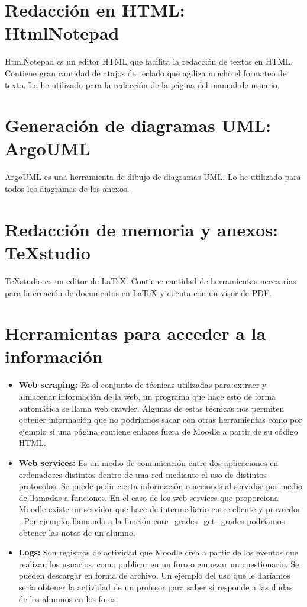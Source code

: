 \section{Redacción en HTML: HtmlNotepad}
HtmlNotepad es un editor HTML que facilita la redacción de textos en HTML. Contiene gran cantidad de atajos de teclado que agiliza mucho el formateo de texto. Lo he utilizado para la redacción de la página del manual de usuario.
\section{Generación de diagramas UML: ArgoUML}
ArgoUML es una herramienta de dibujo de diagramas UML. Lo he utilizado para todos los diagramas de los anexos. 
\section{Redacción de memoria y anexos: TeXstudio}
TeXstudio es un editor de LaTeX. Contiene cantidad de herramientas necesarias para la creación de documentos en LaTeX y cuenta con un visor de PDF.
 
 
 
 
 
 
\section{Herramientas para acceder a la información}
\begin{itemize}
	\item \textbf{Web scraping:}
	Es el conjunto de técnicas utilizadas para extraer y almacenar información de la web, un programa que hace esto de forma automática se llama web crawler. Algunas de estas técnicas nos permiten obtener información que no podríamos sacar con otras herramientas como por ejemplo si una página contiene enlaces fuera de Moodle a partir de su código HTML.
	\item \textbf{Web services:}
	Es un medio de comunicación entre dos aplicaciones en ordenadores distintos dentro de una red mediante el uso de distintos protocolos. Se puede pedir cierta información o acciones al servidor por medio de llamadas a funciones. En el caso de los web services que proporciona Moodle existe un servidor que hace de intermediario entre cliente y proveedor \cite{moodle-2020}. Por ejemplo, llamando a la función core\_grades\_get\_grades podríamos obtener las notas de un alumno.
	\item \textbf{Logs:}
	Son registros de actividad que Moodle crea a partir de los eventos que realizan los usuarios, como publicar en un foro o empezar un cuestionario. Se pueden descargar en forma de archivo. Un ejemplo del uso que le daríamos sería obtener la actividad de un profesor para saber si responde a las dudas de los alumnos en los foros.
\end{itemize}
